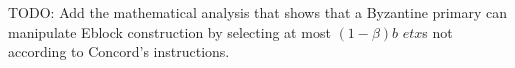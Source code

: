 TODO:
Add the mathematical analysis that shows that a Byzantine primary can manipulate Eblock construction by selecting at most $(1-\beta)b$ $etx$s not according to Concord's instructions.